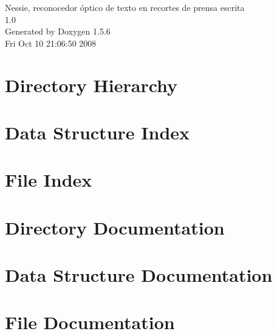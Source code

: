 \documentclass[a4paper]{book}
\begin{document}
\begin{titlepage}
\vspace*{7cm}
\begin{center}
{\Large Nessie, reconocedor óptico de texto en recortes de prensa escrita \\[1ex]\large 1.0 }\\
\vspace*{1cm}
{\large Generated by Doxygen 1.5.6}\\
\vspace*{0.5cm}
{\small Fri Oct 10 21:06:50 2008}\\
\end{center}
\end{titlepage}
\clearemptydoublepage
{}
\tableofcontents
\clearemptydoublepage
{}
\chapter{Directory Hierarchy}

\chapter{Data Structure Index}

\chapter{File Index}

\chapter{Directory Documentation}


\chapter{Data Structure Documentation}







\chapter{File Documentation}















\printindex
\end{document}

